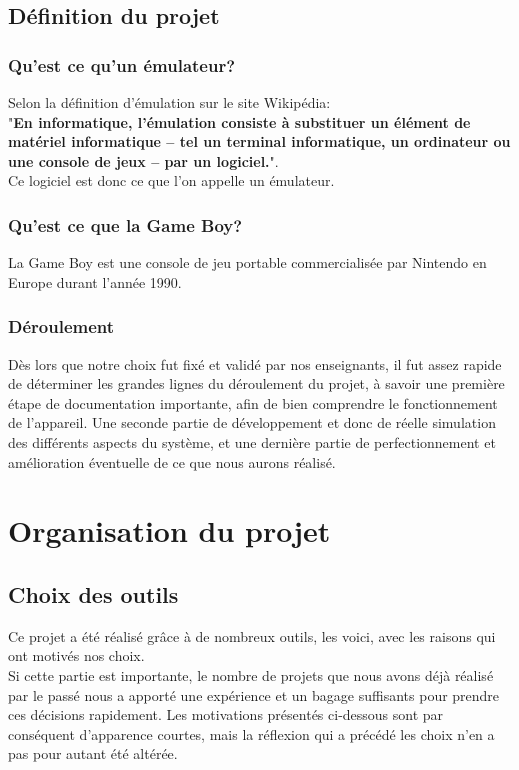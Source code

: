\documentclass{report}
\begin{document}
\section*{Définition du projet}
\subsection*{Qu'est ce qu'un émulateur?}
	Selon la définition d'émulation sur le site Wikipédia:\\"\textbf{En informatique, l'émulation consiste à substituer un élément de matériel informatique – tel un terminal informatique, un ordinateur ou une console de jeux – par un logiciel.}".\\Ce logiciel est donc ce que l'on appelle un émulateur.
\subsection*{Qu'est ce que la Game Boy?}
	La Game Boy est une console de jeu portable commercialisée par Nintendo en Europe durant l'année 1990.
\subsection*{Déroulement}
	Dès lors que notre choix fut fixé et validé par nos enseignants, il
	fut assez rapide de déterminer les grandes lignes du déroulement du
	projet, à savoir une première étape de documentation importante, afin
	de bien comprendre le fonctionnement de l'appareil. Une seconde partie
	de développement et donc de réelle simulation des différents aspects
	du système, et une dernière partie de perfectionnement et
	amélioration éventuelle de ce que nous aurons réalisé.

\chapter{Organisation du projet}
\section{Choix des outils}
Ce projet a été réalisé grâce à de nombreux outils, les voici, avec les raisons qui ont motivés nos choix.\\
Si cette partie est importante, le nombre de projets que nous avons déjà réalisé par le passé nous a apporté une expérience et un bagage suffisants pour prendre ces décisions rapidement. Les motivations présentés ci-dessous sont par conséquent d'apparence courtes, mais la réflexion qui a précédé les choix n'en a pas pour autant été altérée.
\end{document}
